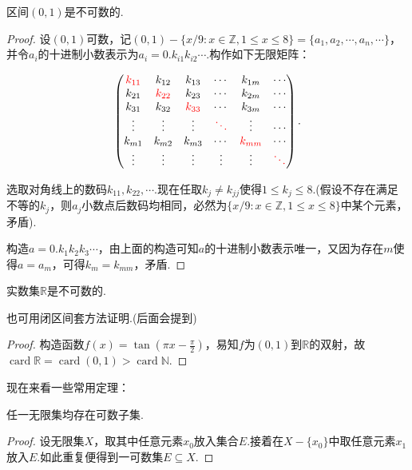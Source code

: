 \documentclass[lang=cn, zihao=5]{elegantbook}
\newcommand{\ssb}[1]{\left( #1 \right)}
\newcommand{\R}{\mathbb{R}}
\DeclareMathOperator{\card}{card}
\begin{document}
\begin{proposition}
	区间$(0,1)$是不可数的.
\end{proposition}
\begin{proof}
	设$(0,1)$可数，记$(0,1)-\{ x/9:x \in \mathbb{Z}, 1 \leq x \leq 8 \}=\{ a_1, a_2, \cdots ,a_n ,\cdots \}$，并令$a_i$的十进制小数表示为$a_i=0.k_{i1}k_{i2}\cdots$.构作如下无限矩阵：
	
	$$\begin{pmatrix}
 \color{red} k_{11} & k_{12} & k_{13} & \cdots & k_{1m} & \cdots \\
 k_{21} & \color{red} k_{22} & k_{23} & \cdots & k_{2m} & \cdots \\
 k_{31} & k_{32} & \color{red} k_{33} & \cdots & k_{3m} & \cdots \\
 \vdots & \vdots & \vdots & \color{red} \ddots & \vdots & \cdots \\
 k_{m1} & k_{m2} & k_{m3} & \cdots & \color{red} k_{mm} & \cdots \\
 \vdots & \vdots & \vdots & \vdots & \vdots & \color{red} \ddots
\end{pmatrix}.$$

	选取对角线上的数码$k_{11},k_{22},\cdots $.现在任取$k_j \neq k_{jj}$使得$1 \leq k_j \leq 8$.(假设不存在满足不等的$k_j$，则$a_j$小数点后数码均相同，必然为$\{ x/9:x \in \mathbb{Z}, 1 \leq x \leq 8 \}$中某个元素，矛盾).
	
	构造$a=0.k_1k_2k_3\cdots$，由上面的构造可知$a$的十进制小数表示唯一，又因为存在$m$使得$a=a_m$，可得$k_m=k_{mm}$，矛盾.
\end{proof}

\begin{corollary}
	实数集$\R$是不可数的.
\end{corollary}
\begin{remark}
	也可用闭区间套方法证明.(后面会提到)
\end{remark}
\begin{proof}
	构造函数$f(x)=\tan \ssb{\pi x-\frac{\pi}{2}}$，易知$f$为$(0,1)$到$\R$的双射，故$\card \R = \card (0,1) > \card \mathbb{N}$.
\end{proof}

现在来看一些常用定理：

\begin{lemma}
	任一无限集均存在可数子集.
\end{lemma}
\begin{proof}
	设无限集$X$，取其中任意元素$x_0$放入集合$E$.接着在$X-\{ x_0 \}$中取任意元素$x_1$放入$E$.如此重复便得到一可数集$E \subseteq X$.
\end{proof}
\end{document}
